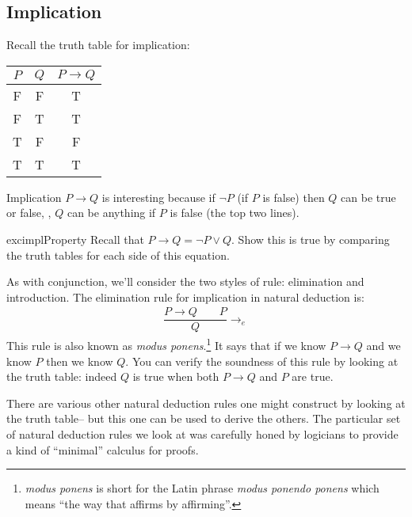 \subsection{Implication}

Recall the truth table for implication:
%
\begin{center}
\begin{tabular}{cc|c}
  $P$ & $Q$ & $P \rightarrow Q$ \\ \hline
  \rowcolor{yellow} F & F & T \\
  \rowcolor{yellow} F & T & T \\
  T & F & F \\
  \rowcolor{yellow} T & T & T
\end{tabular}
\end{center}
%
Implication $P \rightarrow Q$ is interesting because if
$\neg P$ (if $P$ is false) then $Q$ can be true or false, \ie{},
$Q$ can be anything if $P$ is false (the top two lines).

\begin{restatable}{exc}{implProperty}
Recall that $P \rightarrow Q = \neg P \vee Q$. Show this is true
by comparing the truth tables for each side of this equation.
\end{restatable}

As with conjunction, we'll consider the two styles of
rule: elimination and introduction.
The elimination rule for implication in natural deduction is:
\begin{align*}
\dfrac{P \rightarrow Q \qquad P}{Q} {\rightarrow_e}
\end{align*}
%
This rule is also known as \emph{modus ponens}.\footnote{\emph{modus
ponens} is short for the Latin phrase \emph{modus ponendo ponens}
which means ``the way that affirms by affirming''.} It says that if
we know $P \rightarrow Q$ and we know $P$ then we know $Q$. You can
verify the soundness of this rule by looking at the truth
table: indeed $Q$ is true when both $P \rightarrow Q$ and $P$ are
true.

There are various other natural deduction rules one might construct by
looking at the truth table-- but this one can be used to derive the
others. The particular set of natural deduction rules we look at was
carefully honed by logicians to provide a kind of ``minimal'' calculus
for proofs.

